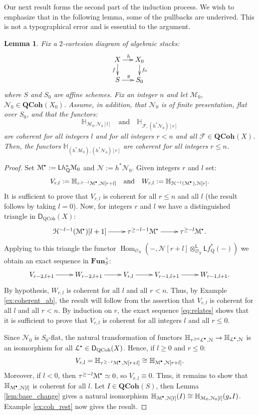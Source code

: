 \documentclass{amsart}
\theoremstyle{plain}
\newtheorem{lem}[thm]{Lemma}
\theoremstyle{definition}
\theoremstyle{remark}
\numberwithin{equation}{section}
\newcommand{\Orb}{\mathcal{O}}
\newcommand{\QCOHB}{\mathbf{QCoh}}
\newcommand{\QCOH}[2][]{\QCOHB^{#1}({#2})}
\DeclareMathOperator{\Hom}{Hom}
\newcommand{\COHO}[1]{\mathcal{H}^{{#1}}}
\newcommand{\trunc}[1]{\tau^{{#1}}}
\newcommand{\LDERF}{\mathsf{L}}
\newcommand{\DCAT}{\mathsf{D}}
\newcommand{\tensor}{\otimes}
\newcommand{\homotopic}{\simeq}
\newcommand{\shv}[1]{\mathcal{{#1}}}
\newcommand{\FUNP}[1]{\mathbf{Fun}_{{#1}}^{\times}}
\newcommand{\E}[2]{\mathbb{H}_{{#1},{#2}}}
\newcommand{\QCPBK}[1]{{#1}_{\mathrm{Q}}^*}
\newcommand{\DQCOH}{\DCAT_{\mathrm{QCoh}}}
\newcommand{\sbt}{\,\begin{picture}(-1,-1)(0,-2)\circle*{1.5}\end{picture}\ }
\newcommand{\cplx}[1]{\shv{{#1}}^{\sbt}}
\begin{document}
Our next result forms the second part of the induction process. We
wish to emphasize that in the following lemma, some of the pullbacks
are underived. This is not a typographical error and is essential to
the argument.  
\begin{lem}\label{lem:red_noeth_mod}
  Fix a $2$-cartesian diagram of algebraic stacks:
  \[
  \xymatrix@-0.8pc{X \ar[r]^h \ar[d]_f & \ar[d]^{f_0} X_0\\ S \ar[r]^g & S_0}
  \]
  where $S$ and $S_0$ are affine schemes. Fix an integer $n$ and let
  $\shv{M}_0$, $\shv{N}_0 \in \QCOH{X_0}$. Assume,
  in addition, that $\shv{N}_0$ is of finite presentation, flat
  over $S_0$, and that the functors: 
  \[
  \E{\shv{M}_0}{\shv{N}_0[l]} \quad \mbox{and} \quad
  \E{\shv{F}}{(h^*\shv{N}_0)[r]}
  \]
  are coherent for all integers $l$ and for all integers $r<n$ and all
  $\shv{F} \in \QCOH{X}$. Then, the functors
  $\E{(h^*\shv{M}_0)}{(h^*\shv{N}_0)[r]}$ are coherent for
  all integers $r\leq n$. 
\end{lem}
\begin{proof}
  Set $\cplx{M} := \LDERF \QCPBK{h}\shv{M}_0$ and $\shv{N} :=
  {h}^*\shv{N}_0$. Given
  integers $r$ and $l$ set: 
  \[
  V_{r,l} := \E{\trunc{\geq -l}\cplx{M}}{\shv{N}[r+l]} \quad
  \mbox{and} \quad 
  W_{r,l} := \E{\COHO{-l}(\cplx{M})}{\shv{N}[r]}.
  \]
  It is sufficient to prove that $V_{r,l}$ is coherent for all
  $r\leq n$ and all $l$ (the result follows by taking $l=0$). Now, for
  integers $r$ and $l$ we have a distinguished triangle in 
  $\DQCOH(X)$: 
  \[
  \xymatrix{\COHO{-l-1}(\cplx{M})[l+1] \ar[r] & \trunc{\geq
      -l-1}\cplx{M} \ar[r] & \trunc{\geq -l}\cplx{M}.}
  \]
  Applying to this triangle the functor
  $\Hom_{\Orb_X}(-,\shv{N}[r+l]\tensor_{\Orb_X}^\LDERF \LDERF
  \QCPBK{f}(-))$ we obtain an exact sequence in $\FUNP{S}$:
  \begin{equation}
    \xymatrix{V_{r-2,l+1} \ar[r] & W_{r-2,l+1}\ar[r] & V_{r,l} \ar[r] &
      V_{r-1,l+1} \ar[r] & W_{r-1,l+1}.}\label{eq:relates}
  \end{equation}
  By hypothesis, $W_{r,l}$ is coherent for all $l$ and all
  $r<n$. Thus, by Example \ref{ex:coherent_ab}, the result will follow
  from the assertion that $V_{r,l}$ is coherent for all $l$ and all
  $r<n$. By induction on $r$, the exact sequence
  \eqref{eq:relates} shows that it is sufficient to prove that
  $V_{r,l}$ is coherent for all integers $l$ and all $r\leq 0$. 

  Since $\shv{N}_0$ is $S_0$-flat, the natural transformation of
  functors $\E{\trunc{\geq 0}\cplx{L}}{\shv{N}} \to
  \E{\cplx{L}}{\shv{N}}$ is an isomorphism for all $\cplx{L} \in
  \DQCOH(X)$. Hence, if $l\geq 0$ and $r\leq 0$:  
  \[
  V_{r,l} = \E{\trunc{\geq -l}\cplx{M}}{\shv{N}[r+l]} \cong 
  \E{\cplx{M}}{\shv{N}[r+l]}. 
  \]
  Moreover, if $l<0$, then $\trunc{\geq
    -l}\cplx{M} \homotopic 0$, so $V_{r,l} \equiv 0$. Thus, it remains
  to show that $\E{\cplx{M}}{\shv{N}[l]}$ is coherent for all
  $l$. Let $I\in \QCOH{S}$,
  then Lemma \ref{lem:base_change} gives a natural isomorphism
  $\E{\cplx{M}}{\shv{N}[l]}(I) \cong
  \E{\shv{M}_0}{\shv{N}_0[l]}(g_*I)$. Example \ref{ex:coh_rest} now
  gives the result.
\end{proof}
\end{document}
